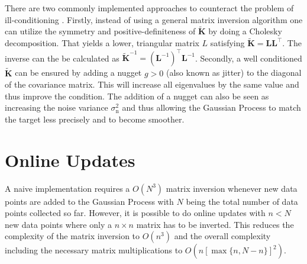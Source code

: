 \documentclass[11pt,a4paper]{scrreprt}
\newcommand{\mat}[1]{\bm{#1}}
\newcommand{\T}{^{\top}}
\newcommand{\ped}[1]{_{\mathrm{#1}}}
\begin{document}
There are two commonly implemented approaches to counteract the problem of 
ill-conditioning \parencite[cp.]{Sacks:1989cv, Neal:1997tj, Booker:1999wz, 
    Gramacy:2008es}. Firstly, instead of using a general matrix inversion 
algorithm one can utilize the symmetry and positive-definiteness of $\tilde{\mat 
    K}$ by doing a Cholesky decomposition. That yields a lower, triangular 
matrix $L$ satisfying $\tilde{\mat K} = \mat L\mat L\T$. The inverse can the be 
calculated as $\tilde{\mat K}^{-1} = (\mat L^{-1})\T \mat L^{-1}$. Secondly, 
a well conditioned $\tilde{\mat K}$ can be ensured by adding a nugget $g > 0$ 
(also known as jitter) to the diagonal of the covariance matrix. This will 
increase all eigenvalues by the same value and thus improve the condition.  The 
addition of a nugget can also be seen as increasing the noise variance 
$\sigma\ped{n}^2$ and thus allowing the Gaussian Process to match the target 
less precisely and to become smoother.


\section{Online Updates}
A naive implementation requires a $O(N^3)$ matrix inversion whenever new data 
points are added to the Gaussian Process with $N$ being the total number of data 
points collected so far. However, it is possible to do online updates with $n 
< N$ new data points where only a $n \times n$ matrix has to be inverted. This 
reduces the complexity of the matrix inversion to $O(n^3)$ and the overall 
complexity including the necessary matrix multiplications to $O(n [\max\{n, 
N - n\}]^2)$.
\end{document}
